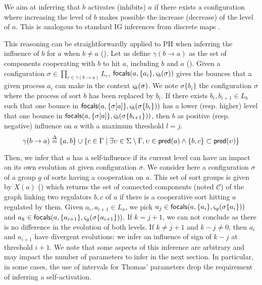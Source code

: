 We aim at inferring that $b$ activates (inhibits) $a$ if there exists a configuration where increasing
the level of $b$ makes possible the increase (decrease) of the level of $a$.
This is analogous to standard IG inferences from discrete maps \cite{RiCo07}.

This reasoning can be straightforwardly applied to PH when inferring the influence of $b$ for $a$
when $b\neq a$ ().
Let us define $\gamma(b\rightarrow a)$ as the set of components cooperating with $b$ to hit $a$,
including $b$ and $a$ ().
Given a configuration $\sigma\in\prod_{c\in\gamma(b\rightarrow a)} L_c$, 
$\mathsf{focals}(a,\{a_i\},\varsigma_b(\sigma))$ gives the bounces that a given process $a_i$ can make in the
context $\varsigma_b(\sigma)$.
We note $\sigma\{b_i\}$ the configuration $\sigma$ where the process of sort $b$ has been replaced
by $b_i$.
If there exists $b_i,b_{i+1}\in L_b$ such that one bounce in 
$\mathsf{focals}(a, \{\sigma[a]\}, \varsigma_b(\sigma\{b_i\}))$
has a lower (resp. higher) level that one bounce in
$\mathsf{focals}(a, \{\sigma[a]\}, \varsigma_b(\sigma\{b_{i+1}\}))$, then
$b$ as positive (resp. negative) influence on $a$ with a maximum threshold $l=j$.
\begin{equation}
\gamma(b\rightarrow a)  \stackrel{\Delta}= \{ a, b \} \cup \{ c \in \Gamma \mid 
			\exists \upsilon\in\Sigma\setminus\Gamma,
				\upsilon\in\mathsf{pred}(a) \wedge \{b,c\}\subset\mathsf{pred}(\upsilon) \}
\label{eq:cooperating-with-b}
\end{equation}


Then, we infer that $a$ has a self-influence if its current level can have an impact on its own
evolution at given configuration $\sigma$.
We consider here a configuration $\sigma$ of a group $g$ of sorts having a cooperation on $a$.
This set of sort groups is given by $X(a)$ () which returns the set of
connected components (noted $\mathcal C$) of the graph linking two regulators $b,c$ of $a$ if there
is a cooperative sort hitting $a$ regulated by them.
Given $a_i,a_{i+1}\in L_a$, we pick $a_j\in\mathsf{focals}(a,\{a_i\},\varsigma_g(\sigma\{a_i\}))$ and
$a_k\in\mathsf{focals}(a,\{a_{i+1}\},\varsigma_g(\sigma\{a_{i+1}\}))$.
If $k=j+1$, we can not conclude as there is no difference in the evolution of both levels.
If $k\neq j+1$ and $k-j\neq 0$, then $a_i$ and $a_{i+1}$ have divergent evolutions: we infer an
influence of sign of $k-j$ at threshold $i+1$.
We note that some aspects of this inference are arbitrary and may impact the number of parameters to
infer in the next section.
In particular, in some cases, the use of intervals for Thomas' parameters drop the requirement of
inferring a self-activation.

